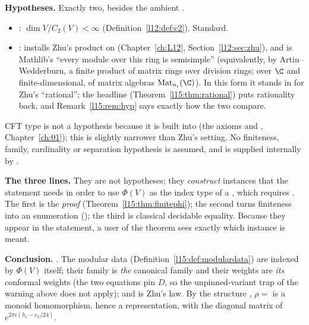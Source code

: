\begin{dictionary}
\textbf{Hypotheses.} Exactly two, besides the ambient .
\begin{itemize}
\item {}: $\dim V/C_2(V)<\infty$ (Definition~\ref{l12:def:c2}). Standard.
\item {}:  installs Zhu's product on  (Chapter~\ref{ch:L12},
  Section~\ref{l12:sec:zhu}), and  is Mathlib's ``every module over this ring is semisimple''
  (equivalently, by Artin--Wedderburn, a finite product of matrix rings over division rings; over $\C$ and finite-dimensional,
  of matrix algebras $\mathrm{Mat}_{n_i}(\C)$). In this form it stands in for Zhu's ``rational''; the headline
  (Theorem~\ref{l15:thm:rational}) puts rationality back, and Remark~\ref{l15:rem:hyp} says exactly how the two compare.
\end{itemize}
CFT type is not a hypothesis because it is built into  (the axioms  and
, Chapter~\ref{ch:01}); this is slightly narrower than Zhu's setting. No finiteness, family, cardinality or
separation hypothesis is assumed, and  is supplied internally by .

\textbf{The three  lines.} They are not hypotheses; they \emph{construct} instances that the statement needs in
order to use $\Phi(V)$ as the index type of a , which requires \lean{[Fintype ι] [DecidableEq ι]}. The
first is the \emph{proof}  (Theorem~\ref{l15:thm:finitephi}); the second turns
finiteness into an enumeration (); the third is classical decidable equality. Because they appear in
the statement, a user of the theorem sees exactly which instance is meant.

\textbf{Conclusion.} .
The modular data (Definition~\ref{l15:def:modulardata}) are indexed by $\Phi(V)$ itself; their family is \emph{the} canonical
family and their weights are \emph{its} conformal weights (the two equations pin $D$, so the unpinned-variant trap of the
warning above does not apply); and  is Zhu's law. By the structure ,
$\rho=$  is a monoid homomorphism, hence a representation, with  the diagonal matrix of
$e^{2\pi i(h_c-c_V/24)}$.


\end{dictionary}
